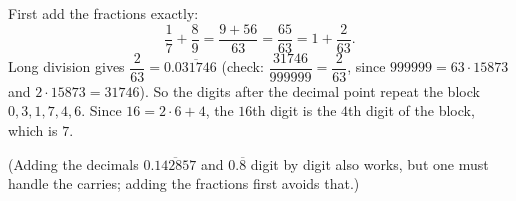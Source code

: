 First add the fractions exactly:
\[\dfrac{1}{7}+\dfrac{8}{9}=\dfrac{9+56}{63}=\dfrac{65}{63}=1+\dfrac{2}{63}.\]
Long division gives $\dfrac{2}{63}=0.\overline{031746}$ (check: $\dfrac{31746}{999999}=\dfrac{2}{63}$, since $999999=63\cdot15873$ and $2\cdot15873=31746$). So the digits after the decimal point repeat the block $0,3,1,7,4,6$. Since $16=2\cdot6+4$, the $16$th digit is the $4$th digit of the block, which is $\boxed{7}$.

(Adding the decimals $0.\overline{142857}$ and $0.\overline{8}$ digit by digit also works, but one must handle the carries; adding the fractions first avoids that.)
